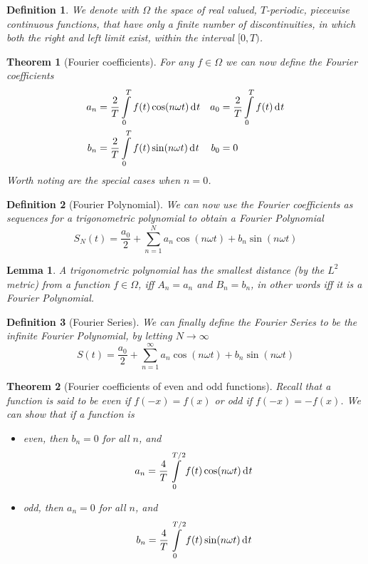 \documentclass[twocolumn, margin=small]{tex/hsrzf}
\theoremstyle{komfourzf}
\newtheorem{theorem}{Theorem}
\newtheorem{definition}{Definition}
\newtheorem{lemma}{Lemma}
\begin{document}
\begin{definition}
  We denote with \(\Omega\) the space of real valued, \(T\)-periodic, piecewise continuous functions, that have only a finite number of discontinuities, in which both the right and left limit exist, within the interval \([0,T)\).
\end{definition}

\begin{theorem}[Fourier coefficients]
  For any \(f\in\Omega\) we can now define the \emph{Fourier coefficients}
  \begin{align*}
    a_n &= \frac{2}{T}\int\limits_0^T f(t)\cos(n\omega t)\,\mathrm{d}^{} t & a_0 &= \frac{2}{T}\int\limits_0^T f(t)\,\mathrm{d}^{} t \\
    b_n &= \frac{2}{T}\int\limits_0^T f(t)\sin(n\omega t)\,\mathrm{d}^{} t & b_0 &= 0
  \end{align*}
  Worth noting are the special cases when \(n=0\).
\end{theorem}

\begin{definition}[Fourier Polynomial]
  We can now use the Fourier coefficients as sequences for a trigonometric polynomial to obtain a \emph{Fourier Polynomial}
  \[
    S_N(t) = \frac{a_0}{2} + \sum_{n=1}^N a_n\cos(n\omega t) + b_n\sin(n\omega t)
  \]
\end{definition}

\begin{lemma}
  A trigonometric polynomial has the smallest distance (by the \(L^2\) metric) from a function \(f\in\Omega\), iff \(A_n = a_n\) and \(B_n = b_n\), in other words iff it is a Fourier Polynomial.
\end{lemma}

\begin{definition}[Fourier Series]
  We can finally define the \emph{Fourier Series} to be the infinite Fourier Polynomial, by letting \(N\to\infty\)
  \[
    S(t) = \frac{a_0}{2} + \sum_{n=1}^\infty a_n\cos(n\omega t) + b_n\sin(n\omega t)
  \]
\end{definition}

\begin{theorem}[Fourier coefficients of even and odd functions]
  Recall that a function is said to be \emph{even} if \(f(-x) = f(x)\) or \emph{odd} if \(f(-x) = -f(x)\). We can show that if a function is
  \begin{itemize}
    \item even, then \(b_n = 0\) for all \(n\), and
      \[
        a_n = \frac{4}{T}\int\limits_0^{T/2} f(t)\cos(n\omega t)\,\mathrm{d}^{} t
      \]
    \item odd, then \(a_n = 0\) for all \(n\), and
      \[
        b_n = \frac{4}{T}\int\limits_0^{T/2} f(t)\sin(n\omega t)\,\mathrm{d}^{} t
      \]
  \end{itemize}
\end{theorem}
\end{document}
